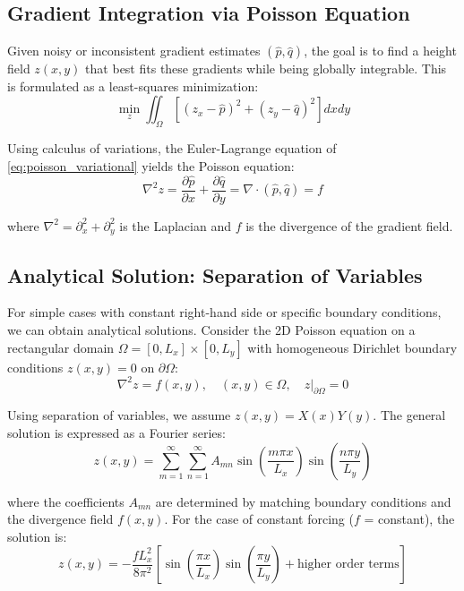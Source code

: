 \documentclass[11pt]{article}
\begin{document}
\subsection{Gradient Integration via Poisson Equation}

Given noisy or inconsistent gradient estimates $(\hat{p}, \hat{q})$, the goal is to find a height field $z(x,y)$ that best fits these gradients while being globally integrable. This is formulated as a least-squares minimization:
\begin{equation}\label{eq:poisson_variational}
\min_z \iint_\Omega \left[(z_x - \hat{p})^2 + (z_y - \hat{q})^2\right] dx dy
\end{equation}

Using calculus of variations, the Euler-Lagrange equation of \eqref{eq:poisson_variational} yields the Poisson equation:
\begin{equation}\label{eq:poisson}
\nabla^2 z = \frac{\partial \hat{p}}{\partial x} + \frac{\partial \hat{q}}{\partial y} = \nabla \cdot (\hat{p}, \hat{q}) = f
\end{equation}

where $\nabla^2 = \partial_x^2 + \partial_y^2$ is the Laplacian and $f$ is the divergence of the gradient field.

\subsection{Analytical Solution: Separation of Variables}

For simple cases with constant right-hand side or specific boundary conditions, we can obtain analytical solutions. Consider the 2D Poisson equation on a rectangular domain $\Omega = [0, L_x] \times [0, L_y]$ with homogeneous Dirichlet boundary conditions $z(x,y) = 0$ on $\partial \Omega$:
\begin{equation}
\nabla^2 z = f(x,y), \quad (x,y) \in \Omega, \quad z|_{\partial \Omega} = 0
\end{equation}

Using separation of variables, we assume $z(x,y) = X(x)Y(y)$. The general solution is expressed as a Fourier series:
\begin{equation}
z(x,y) = \sum_{m=1}^{\infty}\sum_{n=1}^{\infty} A_{mn} \sin\left(\frac{m\pi x}{L_x}\right) \sin\left(\frac{n\pi y}{L_y}\right)
\end{equation}

where the coefficients $A_{mn}$ are determined by matching boundary conditions and the divergence field $f(x,y)$. For the case of constant forcing ($f$ = constant), the solution is:
\begin{equation}
z(x,y) = -\frac{f L_x^2}{8\pi^2} \left[\sin\left(\frac{\pi x}{L_x}\right) \sin\left(\frac{\pi y}{L_y}\right) + \text{higher order terms}\right]
\end{equation}
\end{document}
